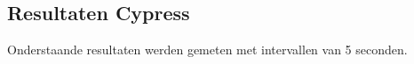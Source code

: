 
\chapter{}
\label{ch:resultaten}

\section{Resultaten Cypress}
Onderstaande resultaten werden gemeten met intervallen van 5 seconden.


